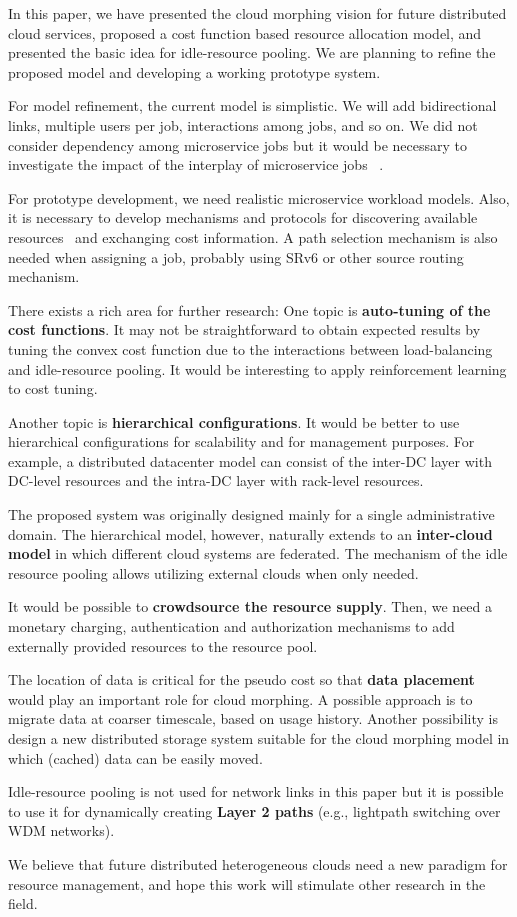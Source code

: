 
In this paper, we have presented the cloud morphing vision for
future distributed cloud services,
proposed a cost function based resource allocation model,
and presented the basic idea for idle-resource pooling.
We are planning to refine the proposed model and developing a working
prototype system.

For model refinement,
the current model is simplistic. We will add bidirectional links,
multiple users per job, interactions among jobs, and so on.
We did not consider dependency among microservice jobs but it would be
necessary to investigate the impact of the interplay of microservice
jobs ~\cite{Suresh-SOA-SOCC2017}.

For prototype development,
we need realistic microservice workload models.
Also, it is necessary to develop mechanisms and protocols for
discovering available resources~\cite{Albrecht2008} and exchanging
cost information.
A path selection mechanism is also needed when assigning a job,
probably using SRv6 or other source routing mechanism.

There exists a rich area for further research:
One topic is {\bf auto-tuning of the cost functions}.
It may not be straightforward to obtain expected results by tuning the
convex cost function due to the interactions between load-balancing
and idle-resource pooling.
It would be interesting to apply reinforcement learning to cost
tuning.

Another topic is {\bf hierarchical configurations}.
It would be better to use hierarchical configurations for scalability
and for management purposes.
For example, a distributed datacenter model can consist of
the inter-DC layer with DC-level resources and the intra-DC layer
with rack-level resources.

The proposed system was originally designed mainly for a single
administrative domain.
The hierarchical model, however, naturally extends to
an {\bf inter-cloud model} in which different cloud systems are
federated.
The mechanism of the idle resource pooling allows utilizing external
clouds when only needed.

It would be possible to {\bf crowdsource the resource supply}. 
Then, we need a monetary charging, authentication and authorization
mechanisms to add externally provided resources to the resource pool.

The location of data is critical for the pseudo cost so that
{\bf data placement} would play an important role for cloud morphing. 
A possible approach is to migrate data at coarser timescale, based
on usage history.
Another possibility is design a new distributed storage system
suitable for the cloud morphing model in which (cached) data can be
easily moved.

Idle-resource pooling is not used for network links in this paper but
it is possible to use it for dynamically creating {\bf Layer 2 paths}
(e.g., lightpath switching over WDM networks).

We believe that future distributed heterogeneous clouds need a new
paradigm for resource management, and hope this work will stimulate
other research in the field.
